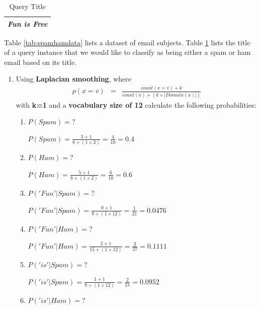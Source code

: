 \documentclass[--SOLUTION-OPTION--]{ditpaper}
\begin{document}
\begin{table}[h]
\caption{Query Title}
\centering
\begin{tabular}{l}
\hline
\textit{Fun is Free}\\
\hline
\end{tabular}
\label{tab:spamhamquery}
\end{table}


\question Table \ref{tab:spamhamdata} lists a dataset of email subjects. Table \ref{tab:spamhamquery} lists the title of a query instance that we would like to classify as being either a spam or ham email based on its title. 
	\begin{enumerate}
		\item Using \textbf{Laplacian smoothing}, where 
		\begin{eqnarray*}
		p(x=v) &=& \frac{count(x=v)+k}{count(x) +( k \times |Domain(x)|)}
		\end{eqnarray*}
		with \textbf{k=1} and a \textbf{vocabulary size of 12} calculate the following probabilities:
			\begin{enumerate}
				\item $P(Spam)=?$
					\begin{answer}
						$P(Spam) = \frac{3+1}{8 + (1 \times 2)} = \frac{4}{10} = 0.4$
					\end{answer}
				\item $P(Ham)=?$
					\begin{answer}
						$P(Ham) = \frac{5+1}{8 + (1 \times 2)} = \frac{6}{10} = 0.6$
					\end{answer}
				\item $P('Fun'|Spam)=?$
					\begin{answer}
						$P('Fun'|Spam) = \frac{0+1}{9 + (1 \times 12)} = \frac{1}{21} = 0.0476$
					\end{answer}
				\item $P('Fun'|Ham)=?$
					\begin{answer}
						$P('Fun'|Ham) = \frac{2+1}{15 + (1 \times 12)} = \frac{3}{27} = 0.1111$
					\end{answer}
				\item $P('is'|Spam)=?$
					\begin{answer}
						$P('is'|Spam) = \frac{1+1}{9 + (1 \times 12)} = \frac{2}{21} = 0.0952$
					\end{answer}
				\item $P('is'|Ham)=?$
					\begin{answer}

\end{answer}
\end{enumerate}
\end{enumerate}
\end{document}
